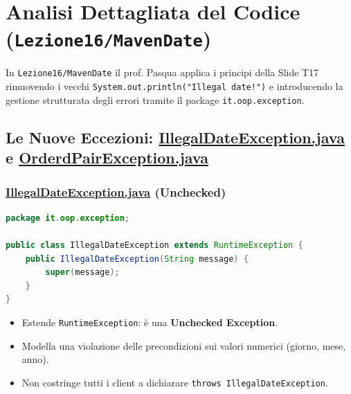 \documentclass[11pt,a4paper,oneside]{report}
\newcommand{\passthrough}[1]{#1}
\providecommand{\tightlist}{\setlength{\itemsep}{0pt}\setlength{\parskip}{0pt}}
\begin{document}
\section{\texorpdfstring{Analisi Dettagliata del Codice
(\texttt{Lezione16/MavenDate})}{Analisi Dettagliata del Codice (Lezione16/MavenDate)}}\label{chap16_analisi-dettagliata-del-codice-lezione16mavendate}

In \passthrough{\lstinline!Lezione16/MavenDate!} il prof. Pasqua applica
i principi della Slide T17 rimuovendo i vecchi
\passthrough{\lstinline'System.out.println("Illegal date!")'} e
introducendo la gestione strutturata degli errori tramite il package
\passthrough{\lstinline!it.oop.exception!}.

\subsection{\texorpdfstring{Le Nuove Eccezioni:
\href{file:///home/wally/Documenti/GitHub/Programmazione-II/25-26/Teoria-e-Esercitazioni/Codice-20260902/Lezione16/MavenDate/src/main/java/it/oop/exception/IllegalDateException.java}{IllegalDateException.java}
e
\href{file:///home/wally/Documenti/GitHub/Programmazione-II/25-26/Teoria-e-Esercitazioni/Codice-20260902/Lezione16/MavenDate/src/main/java/it/oop/exception/OrderdPairException.java}{OrderdPairException.java}}{Le Nuove Eccezioni: IllegalDateException.java e OrderdPairException.java}}\label{chap16_le-nuove-eccezioni-illegaldateexception.java-e-orderdpairexception.java}

\subsubsection{\texorpdfstring{\href{file:///home/wally/Documenti/GitHub/Programmazione-II/25-26/Teoria-e-Esercitazioni/Codice-20260902/Lezione16/MavenDate/src/main/java/it/oop/exception/IllegalDateException.java}{IllegalDateException.java}
(Unchecked)}{IllegalDateException.java (Unchecked)}}\label{chap16_illegaldateexception.java-unchecked}

\begin{lstlisting}[language=Java]
package it.oop.exception;

public class IllegalDateException extends RuntimeException {
    public IllegalDateException(String message) {
        super(message);
    }
}
\end{lstlisting}

\begin{itemize}
\tightlist
\item
  Estende \passthrough{\lstinline!RuntimeException!}: è una
  \textbf{Unchecked Exception}.
\item
  Modella una violazione delle precondizioni sui valori numerici
  (giorno, mese, anno).
\item
  Non costringe tutti i client a dichiarare
  \passthrough{\lstinline!throws IllegalDateException!}.
\end{itemize}
\end{document}
